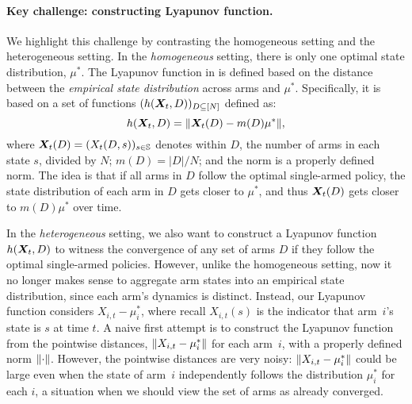 \documentclass[11pt,letterpaper]{article}
\begin{document}
\paragraph{Key challenge: constructing Lyapunov function.}
We highlight this challenge by contrasting the homogeneous setting and the heterogeneous setting.
In the \emph{homogeneous} setting, there is only one optimal state distribution, $\mu^*$.
The Lyapunov function in \citep{HonXieChe_24} is defined based on the distance between the \emph{empirical state distribution} across arms and $\mu^*$.  Specifically, it is based on a set of functions $(h({\bm{X}}_t,D))_{D\subseteq [N]}$ defined as:
\begin{equation}
    h({\bm{X}}_t,D)=\|{\bm{X}}_t(D)-m(D)\mu^*\|,
\end{equation}
where ${\bm{X}}_t(D)=(X_t(D,s))_{s\in\mathbb{S}}$ denotes within $D$, the number of arms in each state $s$, divided by $N$; $m(D)=|D|/N$; and the norm is a properly defined norm.
The idea is that if all arms in $D$ follow the optimal single-armed policy, the state distribution of each arm in $D$ gets closer to $\mu^*$, and thus ${\bm{X}}_t(D)$ gets closer to $m(D)\mu^*$ over time. 


In the \emph{heterogeneous} setting, we also want to construct a Lyapunov function $h({\bm{X}}_t, D)$ to witness the convergence of any set of arms $D$ if they  follow the optimal single-armed policies. 
However, unlike the homogeneous setting, now it no longer makes sense to aggregate arm states into an empirical state distribution, since each arm's dynamics is distinct.
Instead, our Lyapunov function considers $X_{i,t}-\mu_i^*$, where recall $X_{i,t}(s)$ is the indicator that arm~$i$'s state is $s$ at time $t$. 
A naive first attempt is to construct the Lyapunov function from the pointwise distances, $\left\lVert X_{i,t}-\mu_i^*\right\rVert$ for each arm~$i$, with a properly defined norm $\left\lVert\cdot\right\rVert$. 
However, the pointwise distances are very noisy: $\left\lVert X_{i,t}-\mu_i^*\right\rVert$  could be large even when the state of arm~$i$ independently follows the distribution $\mu_i^*$ for each $i$, a situation when we should view the set of arms as already converged. 
\end{document}
